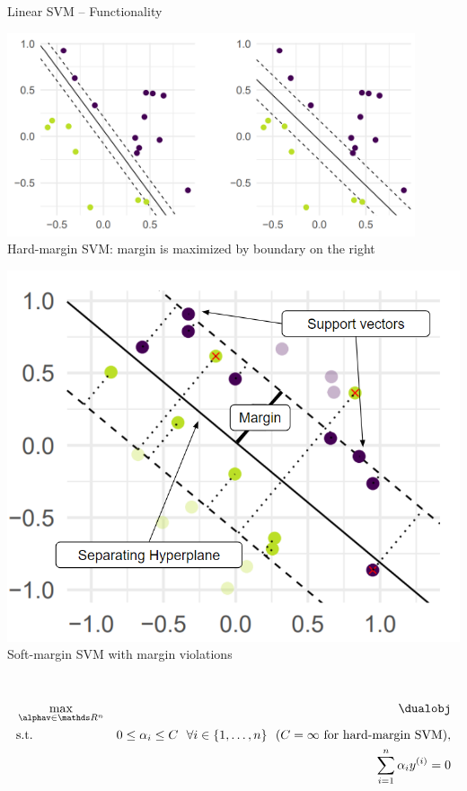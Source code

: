 \begin{vbframe}{Linear SVM -- Functionality}
\medskip
\footnotesize
\begin{minipage}{0.6\textwidth}
  \centering
  \includegraphics[width=0.9\textwidth]{figure/svm_motivation_hard_margin.png}
  \\
  \tiny{Hard-margin SVM: margin is maximized by boundary on the right}
\end{minipage}
\hfill
\begin{minipage}{0.3\textwidth}
  \centering
  \includegraphics[width=1.1\textwidth]{figure/svm_wording.png} \\
  \tiny{Soft-margin SVM with margin violations}
\end{minipage}

\medskip

 ~~ %
\begin{eqnarray*}
    & \max\limits_{\alphav \in \R^n} & \dualobj \\
    & \text{s.t. } & 0 \le \alpha_i \le C ~~ \forall i \in \nset ~~ (C = \infty
    \text{ for hard-margin SVM)}, \\
    & \quad & \sum_{i=1}^n \alpha_i \yi = 0
\end{eqnarray*}


\end{vbframe}

